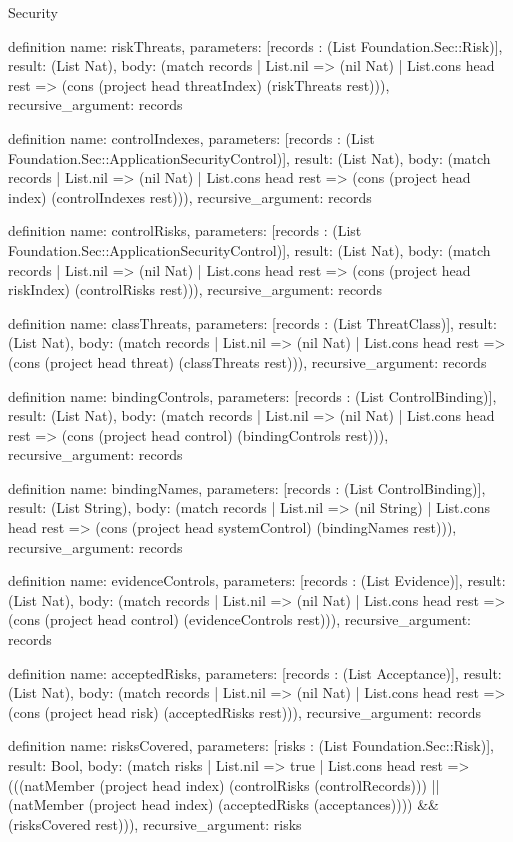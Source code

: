 \begin{lexlean}{Security}
\begin{semanticmodule}
definition{
  name: riskThreats,
  parameters: [records : (List Foundation.Sec::Risk)],
  result: (List Nat),
  body: (match records
    | List.nil => (nil Nat)
    | List.cons head rest => (cons (project head threatIndex) (riskThreats rest))),
  recursive_argument: records
}

definition{
  name: controlIndexes,
  parameters: [records : (List Foundation.Sec::ApplicationSecurityControl)],
  result: (List Nat),
  body: (match records
    | List.nil => (nil Nat)
    | List.cons head rest => (cons (project head index) (controlIndexes rest))),
  recursive_argument: records
}

definition{
  name: controlRisks,
  parameters: [records : (List Foundation.Sec::ApplicationSecurityControl)],
  result: (List Nat),
  body: (match records
    | List.nil => (nil Nat)
    | List.cons head rest => (cons (project head riskIndex) (controlRisks rest))),
  recursive_argument: records
}

definition{
  name: classThreats,
  parameters: [records : (List ThreatClass)],
  result: (List Nat),
  body: (match records
    | List.nil => (nil Nat)
    | List.cons head rest => (cons (project head threat) (classThreats rest))),
  recursive_argument: records
}

definition{
  name: bindingControls,
  parameters: [records : (List ControlBinding)],
  result: (List Nat),
  body: (match records
    | List.nil => (nil Nat)
    | List.cons head rest => (cons (project head control) (bindingControls rest))),
  recursive_argument: records
}

definition{
  name: bindingNames,
  parameters: [records : (List ControlBinding)],
  result: (List String),
  body: (match records
    | List.nil => (nil String)
    | List.cons head rest => (cons (project head systemControl) (bindingNames rest))),
  recursive_argument: records
}

definition{
  name: evidenceControls,
  parameters: [records : (List Evidence)],
  result: (List Nat),
  body: (match records
    | List.nil => (nil Nat)
    | List.cons head rest => (cons (project head control) (evidenceControls rest))),
  recursive_argument: records
}

definition{
  name: acceptedRisks,
  parameters: [records : (List Acceptance)],
  result: (List Nat),
  body: (match records
    | List.nil => (nil Nat)
    | List.cons head rest => (cons (project head risk) (acceptedRisks rest))),
  recursive_argument: records
}

definition{
  name: risksCovered,
  parameters: [risks : (List Foundation.Sec::Risk)],
  result: Bool,
  body: (match risks
    | List.nil => true
    | List.cons head rest => (((natMember (project head index) (controlRisks (controlRecords))) || (natMember (project head index) (acceptedRisks (acceptances)))) && (risksCovered rest))),
  recursive_argument: risks
}


\end{semanticmodule}
\end{lexlean}
